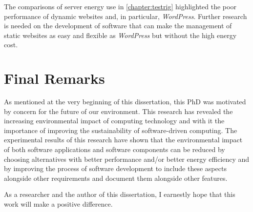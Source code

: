 The comparisons of server energy use in \autoref{chapter:testrig} highlighted the poor performance of dynamic websites and, in particular, \emph{WordPress}. Further research is needed on the development of software that can make the management of static websites as easy and flexible as \emph{WordPress} but without the high energy cost.

\section{Final Remarks}

As mentioned at the very beginning of this dissertation, this PhD was motivated by concern for the future of our environment. This research has revealed the increasing environmental impact of computing technology and with it the importance of improving the sustainability of software-driven computing. The experimental results of this research have shown that the environmental impact of both software applications and software components can be reduced by choosing alternatives with better performance and/or better energy efficiency and by improving the process of software development to include these aspects alongside other requirements and document them alongside other features.

As a researcher and the author of this dissertation, I earnestly hope that this work will make a positive difference.
